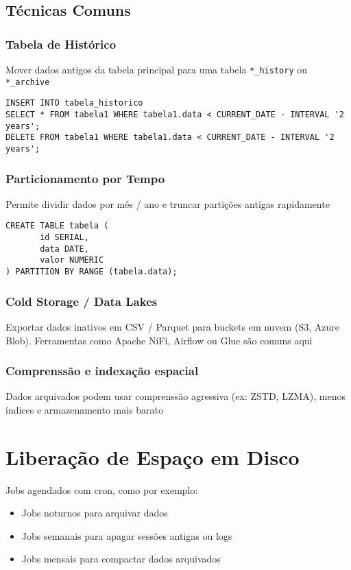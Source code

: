 \documentclass[11pt]{article}
\begin{document}
\subsection{Técnicas Comuns}
\label{sec:orga7560ef}

\subsubsection{Tabela de Histórico}
\label{sec:org226d850}
Mover dados antigos da tabela principal para uma tabela \texttt{*\_history} ou \texttt{*\_archive}

\begin{verbatim}
INSERT INTO tabela_historico
SELECT * FROM tabela1 WHERE tabela1.data < CURRENT_DATE - INTERVAL '2 years';
DELETE FROM tabela1 WHERE tabela1.data < CURRENT_DATE - INTERVAL '2 years';
\end{verbatim}
\subsubsection{Particionamento por Tempo}
\label{sec:orgaa770dd}
Permite dividir dados por mês / ano e truncar partições antigas rapidamente

\begin{verbatim}
CREATE TABLE tabela (
       id SERIAL,
       data DATE,
       valor NUMERIC
) PARTITION BY RANGE (tabela.data);
\end{verbatim}
\subsubsection{Cold Storage / Data Lakes}
\label{sec:org1947609}
Exportar dados inativos em CSV / Parquet para buckets em nuvem (S3, Azure Blob). Ferramentas
como Apache NiFi, Airflow ou Glue são comuns aqui
\subsubsection{Comprenssão e indexação espacial}
\label{sec:org764a562}
Dados arquivados podem usar comprenssão agressiva (ex: ZSTD, LZMA), menos índices e armazenamento
mais barato
\section{Liberação de Espaço em Disco}
\label{sec:org5374c85}

Jobs agendados com cron, como por exemplo:
\begin{itemize}
\item Jobs noturnos para arquivar dados
\item Jobs semanais para apagar sessões antigas ou logs
\item Jobs mensais para compactar dados arquivados
\end{itemize}
\end{document}
